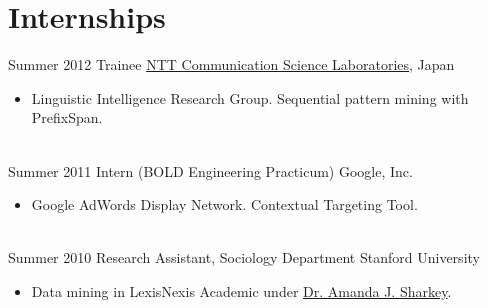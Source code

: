 \documentclass[letterpaper]{twentysecondcv} %
\begin{document}
\section{Internships}
\begin{twenty}
	\twentyitem
    	{Summer}
        {2012}
        {Trainee}
        {\href{http://www.kecl.ntt.co.jp/rps/index.html}{NTT Communication Science Laboratories}, Japan}
        {}
        {\begin{itemize} \itemsep 2pt %
        \item Linguistic Intelligence Research Group. Sequential pattern mining with PrefixSpan.
        \end{itemize}}
    \\
    \twentyitem
    	{Summer}
        {2011}
        {Intern (BOLD Engineering Practicum)}
        {Google, Inc.}
        {}
        {\begin{itemize}  \itemsep 2pt %
        \item Google AdWords Display Network. Contextual Targeting Tool.
        \end{itemize}}
    \\
    \twentyitem
    	{Summer}
        {2010}
        {Research Assistant, Sociology Department}
        {Stanford University}
        {}
        {\begin{itemize}  \itemsep 2pt %
        \item Data mining in LexisNexis Academic under \href{https://www.chicagobooth.edu/faculty/directory/s/amanda-j-sharkey}{Dr. Amanda J. Sharkey}.
        \end{itemize} }
\end{twenty}
\end{document}
